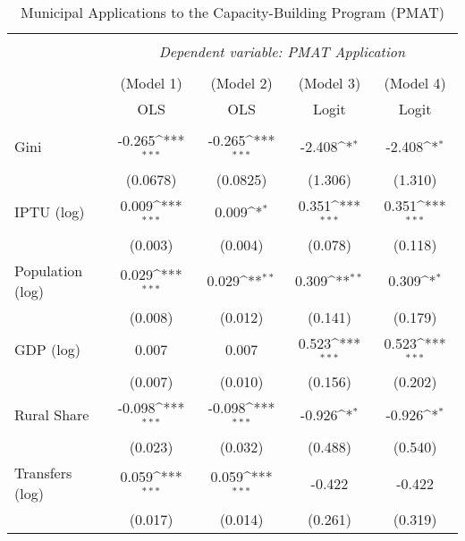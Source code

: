 \documentclass[12pt,a4paper]{article}
\begin{document}
\begin{table}
\centering
  \caption{Municipal Applications to the Capacity-Building Program (PMAT)} 
  \label{pmat} 
{
\def\sym#1{\ifmmode^{#1}\else\(^{#1}\)\fi}
\begin{tabular}{l*{4}{c}}
\hline\hline\\[-1.8ex] 
 & \multicolumn{4}{c}{\textit{Dependent variable: PMAT Application}} \\ 
\cline{2-5}\\[-1.8ex]  
            &\multicolumn{1}{c}{(Model 1)}&\multicolumn{1}{c}{(Model 2)}&\multicolumn{1}{c}{(Model 3)}&\multicolumn{1}{c}{(Model 4)}\\
            &\multicolumn{1}{c}{OLS}&\multicolumn{1}{c}{OLS}&\multicolumn{1}{c}{Logit}&\multicolumn{1}{c}{Logit}\\
\hline\\[-1.8ex] 
Gini        &      -0.265\sym{***}&      -0.265\sym{***}&      -2.408\sym{*}  &      -2.408\sym{*}  \\
            &    (0.0678)         &    (0.0825)         &     (1.306)         &     (1.310)         \\
[1em]
IPTU (log)     &     0.009\sym{***}&     0.009\sym{*}  &       0.351\sym{***}&       0.351\sym{***}\\
            &   (0.003)         &   (0.004)         &    (0.078)         &     (0.118)         \\
[1em]
Population (log)      &      0.029\sym{***}&      0.029\sym{**} &       0.309\sym{**} &       0.309\sym{*}  \\
            &   (0.008)         &    (0.012)         &     (0.141)         &     (0.179)         \\
[1em]
GDP (log)      &     0.007         &     0.007         &       0.523\sym{***}&       0.523\sym{***}\\
            &   (0.007)         &   (0.010)         &     (0.156)         &     (0.202)         \\
[1em]
Rural Share  &     -0.098\sym{***}&     -0.098\sym{***}&      -0.926\sym{*}  &      -0.926\sym{*}  \\
            &    (0.023)         &    (0.032)         &     (0.488)         &     (0.540)         \\
[1em]
Transfers (log) &      0.059\sym{***}&      0.059\sym{***}&      -0.422         &      -0.422         \\
            &    (0.017)         &    (0.014)         &     (0.261)         &     (0.319)         \\

\end{tabular}}
\end{table}
\end{document}
